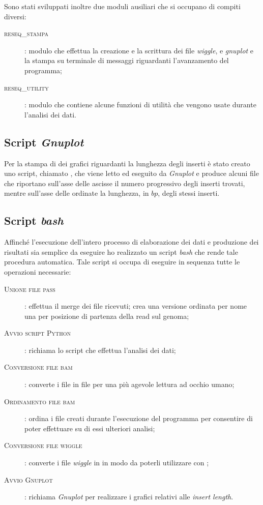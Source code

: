 Sono stati sviluppati inoltre due moduli ausiliari che si occupano di compiti diversi:
\begin{description}
\item[\textsc{reseq\_stampa}]: modulo che effettua la creazione e la scrittura dei file \emph{wiggle},  e \emph{gnuplot} e la stampa su terminale di messaggi riguardanti l'avanzamento del programma;

\item[\textsc{reseq\_utility}]: modulo che contiene alcune funzioni di utilità che vengono usate durante l'analisi dei dati.
\end{description}

\subsection{Script \emph{Gnuplot}}
Per la stampa di dei grafici riguardanti la lunghezza degli inserti è stato creato uno script, chiamato , che viene letto ed eseguito da \emph{Gnuplot} e produce alcuni file  che riportano sull'asse delle ascisse il numero progressivo degli inserti trovati, mentre sull'asse delle ordinate la lunghezza, in $bp$, degli stessi inserti.

\subsection{Script \emph{bash}}
\label{sec:bash}
Affinché l'esecuzione dell'intero processo di elaborazione dei dati e produzione dei risultati sia semplice da eseguire ho realizzato un script \emph{bash} che rende tale procedura automatica.
Tale script si occupa di eseguire in sequenza tutte le operazioni necessarie:

\begin{description}
\item[\textsc{Unione file pass}]: effettua il merge dei file  ricevuti; crea una versione ordinata per nome una per posizione di partenza della read sul genoma;
\item[\textsc{Avvio script Python}]: richiama lo script  che effettua l'analisi dei dati;
\item[\textsc{Conversione file bam}]: converte i file  in file  per una più agevole lettura ad occhio umano;
\item[\textsc{Ordinamento file bam}]: ordina i file  creati durante l'esecuzione del programma per consentire di poter effettuare su di essi ulteriori analisi;
\item[\textsc{Conversione file wiggle}]: converte i file \emph{wiggle} in  in modo da poterli utilizzare con ;
\item[\textsc{Avvio Gnuplot}]: richiama \emph{Gnuplot} per realizzare i grafici relativi alle \emph{insert length}.
\end{description}



